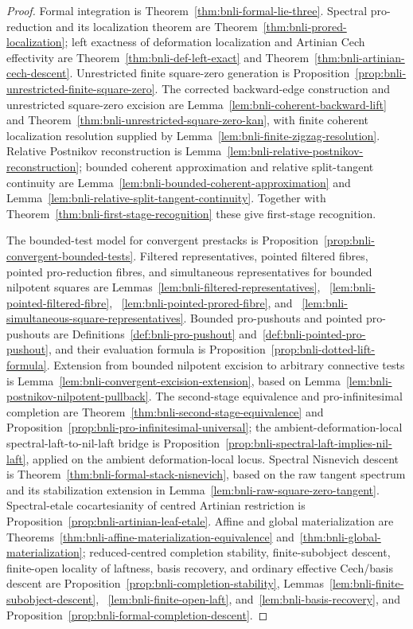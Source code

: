 \begin{proof}
Formal integration is Theorem~\ref{thm:bnli-formal-lie-three}.  Spectral
pro-reduction and its localization theorem are
Theorem~\ref{thm:bnli-prored-localization}; left exactness of deformation
localization and Artinian Cech effectivity are
Theorem~\ref{thm:bnli-def-left-exact} and
Theorem~\ref{thm:bnli-artinian-cech-descent}.  Unrestricted finite
square-zero generation is
Proposition~\ref{prop:bnli-unrestricted-finite-square-zero}.  The corrected
backward-edge construction and unrestricted square-zero excision are
Lemma~\ref{lem:bnli-coherent-backward-lift} and
Theorem~\ref{thm:bnli-unrestricted-square-zero-kan}, with finite coherent localization
resolution supplied by Lemma~\ref{lem:bnli-finite-zigzag-resolution}.
Relative Postnikov reconstruction is
Lemma~\ref{lem:bnli-relative-postnikov-reconstruction}; bounded coherent
approximation and relative split-tangent continuity are
Lemma~\ref{lem:bnli-bounded-coherent-approximation} and
Lemma~\ref{lem:bnli-relative-split-tangent-continuity}.  Together with
Theorem~\ref{thm:bnli-first-stage-recognition} these give first-stage
recognition.

The bounded-test model for convergent prestacks is
Proposition~\ref{prop:bnli-convergent-bounded-tests}.  Filtered
representatives, pointed filtered fibres, pointed pro-reduction fibres, and
simultaneous representatives for bounded nilpotent squares are
Lemmas~\ref{lem:bnli-filtered-representatives},
~\ref{lem:bnli-pointed-filtered-fibre},
~\ref{lem:bnli-pointed-prored-fibre}, and
~\ref{lem:bnli-simultaneous-square-representatives}.  Bounded pro-pushouts
and pointed pro-pushouts are Definitions~\ref{def:bnli-pro-pushout}
and~\ref{def:bnli-pointed-pro-pushout}, and their evaluation formula is
Proposition~\ref{prop:bnli-dotted-lift-formula}.  Extension from bounded
nilpotent excision to arbitrary connective tests is
Lemma~\ref{lem:bnli-convergent-excision-extension}, based on
Lemma~\ref{lem:bnli-postnikov-nilpotent-pullback}.  The second-stage
equivalence and pro-infinitesimal completion are
Theorem~\ref{thm:bnli-second-stage-equivalence} and
Proposition~\ref{prop:bnli-pro-infinitesimal-universal}; the
ambient-deformation-local spectral-laft-to-nil-laft bridge is
Proposition~\ref{prop:bnli-spectral-laft-implies-nil-laft}, applied on the ambient deformation-local locus.  Spectral
Nisnevich
descent is Theorem~\ref{thm:bnli-formal-stack-nisnevich}, based on the raw
tangent spectrum and its stabilization extension in
Lemma~\ref{lem:bnli-raw-square-zero-tangent}.  Spectral-etale cocartesianity
of centred Artinian restriction is
Proposition~\ref{prop:bnli-artinian-leaf-etale}.  Affine and global
materialization are
Theorems~\ref{thm:bnli-affine-materialization-equivalence}
and~\ref{thm:bnli-global-materialization}; reduced-centred completion
stability, finite-subobject descent, finite-open locality of laftness, basis
recovery, and ordinary effective Cech/basis descent are
Proposition~\ref{prop:bnli-completion-stability},
Lemmas~\ref{lem:bnli-finite-subobject-descent},
~\ref{lem:bnli-finite-open-laft}, and~\ref{lem:bnli-basis-recovery}, and
Proposition~\ref{prop:bnli-formal-completion-descent}.


\end{proof}
